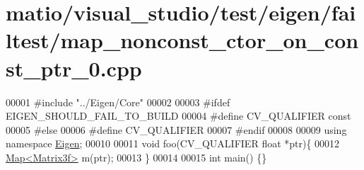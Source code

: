 \hypertarget{matio_2visual__studio_2test_2eigen_2failtest_2map__nonconst__ctor__on__const__ptr__0_8cpp_source}{}\section{matio/visual\+\_\+studio/test/eigen/failtest/map\+\_\+nonconst\+\_\+ctor\+\_\+on\+\_\+const\+\_\+ptr\+\_\+0.cpp}
\label{matio_2visual__studio_2test_2eigen_2failtest_2map__nonconst__ctor__on__const__ptr__0_8cpp_source}

\begin{DoxyCode}
00001 \textcolor{preprocessor}{#include "../Eigen/Core"}
00002 
00003 \textcolor{preprocessor}{#ifdef EIGEN\_SHOULD\_FAIL\_TO\_BUILD}
00004 \textcolor{preprocessor}{#define CV\_QUALIFIER const}
00005 \textcolor{preprocessor}{#else}
00006 \textcolor{preprocessor}{#define CV\_QUALIFIER}
00007 \textcolor{preprocessor}{#endif}
00008 
00009 \textcolor{keyword}{using namespace }\hyperlink{namespace_eigen}{Eigen};
00010 
00011 \textcolor{keywordtype}{void} foo(CV\_QUALIFIER \textcolor{keywordtype}{float} *ptr)\{
00012     \hyperlink{group___core___module_class_eigen_1_1_map}{Map<Matrix3f>} m(ptr);
00013 \}
00014 
00015 \textcolor{keywordtype}{int} main() \{\}
\end{DoxyCode}
